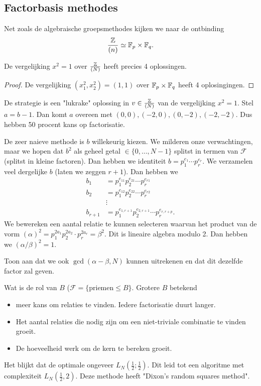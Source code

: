 \subsection{Factorbasis methodes} \label{sec:factorbasis_methodes}
Net zoals de algebraische groepsmethodes kijken we naar de ontbinding
\[
	\frac{\mathbb{Z}}{(n)} \simeq \mathbb{F}_p \times \mathbb{F}_q
.\] 
\begin{lemma}
	De vergelijking $x^2 = 1$ over $\frac{\mathbb{Z}}{(N)}$ heeft precies 4 oplossingen. 
\end{lemma}
\begin{proof}
	De vergelijking $(x_1^2, x_2^2) = (1, 1)$ over $\mathbb{F}_p \times  \mathbb{F}_q$ heeft 4 oplosingingen.
\end{proof}
De strategie is een "lukrake" oplossing in $v \in \frac{\mathbb{Z}}{(N)}$ van de vergelijking $x^2 = 1$. 
Stel $a = b-1$. Dan komt $a$ overeen met $(0, 0), (-2, 0), (0, -2), (-2, -2)$. Dus hebben 50 procent kans op factorisatie.

De zeer naieve methode is $b$ willekeurig kiezen. 
We milderen onze verwachtingen, maar we hopen dat $b^2$ als geheel getal $\in \{0, \ldots, N-1\} $ splitst in termen van $\mathcal{F} $ (splitst in kleine factoren).
Dan hebben we identiteit $b = p_1^{e_1}\cdots p_r^{e_r}$. 
We verzamelen veel dergelijke $b$ (laten we zeggen  $r + 1$). 
Dan hebben we 
\begin{align*}
	b_1 &= p_1^{e_{11}}p_2^{e_{21}} \cdots p_r^{e_{r1}}\\
	b_2 &= p_1^{e_{12}}p_2^{e_{22}} \cdots p_r^{e_{r 2}} \\
	    &\vdots \\
	b_{r +1} &= p_1^{e_{1, r + 1}} p_2^{e_{2, r + 1}} \cdots p_r ^{e_{r, r + p}} 
.\end{align*}
We bewereken een aantal relatie te kunnen selecteren waarvan het product van de vorm $(\alpha)^2 = p_1^{2a_1}p_2^{2a_2}\cdot p_r^{2a_r} = \beta^2$. 
Dit is lineaire algebra modulo 2. 
Dan hebben we $\left( \alpha / \beta \right)^2=1 $.

\begin{oef}
	Toon aan dat we ook $\gcd(\alpha - \beta, N)$ kunnen uitrekenen en dat dit dezelfde factor zal geven. 	
\end{oef}

\begin{opmerking}
	Wat is de rol van $B$ ($\mathcal{F}  = \{\text{priemen} \le B\} $.
	Grotere $B$ betekend 
	\begin{itemize}
		\item 
	meer kans om relaties te vinden. Iedere factorisatie duurt langer. 
\item 
	Het aantal relaties die nodig zijn om een niet-triviale combinatie te vinden groeit.
\item 
	De hoeveelheid werk om de kern te bereken groeit. 
	\end{itemize}
	Het blijkt dat de optimale  ongeveer $L_N(\frac{1}{2}; \frac{1}{2})$. Dit leid tot een algoritme met complexiteit $L_N(\frac{1}{2}, 2)$. 
	Deze methode heeft "Dixon's random squares method".
\end{opmerking}


